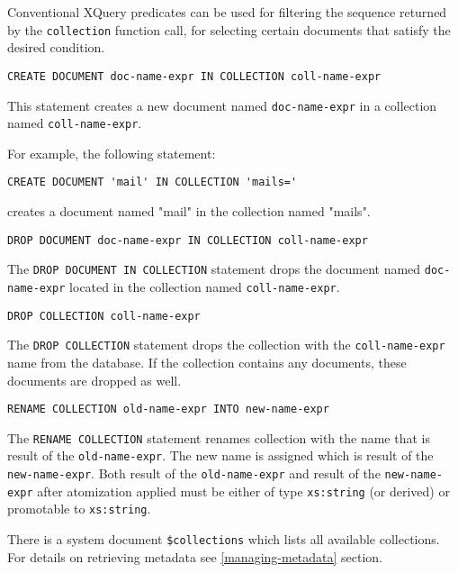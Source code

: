 \documentclass[a4paper,12pt]{article}
\begin{document}
Conventional XQuery predicates can be used for filtering the sequence returned
by the \verb!collection! function call, for selecting certain documents that
satisfy the desired condition.

\begin{verbatim}
CREATE DOCUMENT doc-name-expr IN COLLECTION coll-name-expr
\end{verbatim}

This statement creates a new document named \verb!doc-name-expr! in a collection
named \verb!coll-name-expr!.

For example, the following statement:
\begin{verbatim}
CREATE DOCUMENT 'mail' IN COLLECTION 'mails='
\end{verbatim}
creates a document named "mail" in the collection named "mails".

\begin{verbatim}
DROP DOCUMENT doc-name-expr IN COLLECTION coll-name-expr
\end{verbatim}

The \verb!DROP DOCUMENT IN COLLECTION! statement drops the document named
\verb!doc-name-expr! located in the collection named \verb!coll-name-expr!.

\begin{verbatim}
DROP COLLECTION coll-name-expr
\end{verbatim}

The \verb!DROP COLLECTION! statement drops the collection with the
\verb!coll-name-expr! name from the database. If the collection contains any
documents, these documents are dropped as well.

\begin{verbatim}
RENAME COLLECTION old-name-expr INTO new-name-expr
\end{verbatim}

The \verb!RENAME COLLECTION! statement renames collection with the name that is
result of the \verb!old-name-expr!. The new name is assigned which is result of
the \verb!new-name-expr!. Both result of the \verb!old-name-expr! and result of
the \verb!new-name-expr! after atomization applied must be either of type
\verb!xs:string! (or derived) or promotable to \verb!xs:string!.

There is a system document \verb!$collections! which lists all available
collections. For details on retrieving metadata see \ref{managing-metadata}
section.


\end{document}
